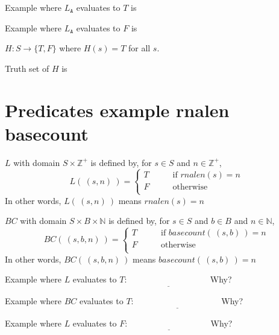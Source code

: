 \documentclass[12pt, oneside]{article}
\newcommand{\A}[0]{\texttt{A}}
\newcommand{\C}[0]{\texttt{C}}
\newcommand{\G}[0]{\texttt{G}}
\newcommand{\U}[0]{\texttt{U}}
\begin{document}
Example where $L_{\A}$ evaluates to $T$ is \underline{\phantom{$\A\C\G$~\hspace{1in}}}

\vfill

Example where $L_{\A}$ evaluates to $F$ is \underline{\phantom{$\U\A\C\U$\hspace{1in}}}

\vfill


$H: S \to \{T, F\}$ where $H(s) = T$ for all $s$.

Truth set of $H$ is \underline{}

\vfill
 \vfill
\section*{Predicates example rnalen basecount}




$L$ with domain $S \times \mathbb{Z}^+$ is defined by, for $s \in S$ and $n \in \mathbb{Z}^+$,
\[
L( ~(s, n)~) = \begin{cases}
T &\qquad\text{if $rnalen(s) = n$}\\
F &\qquad\text{otherwise}\\
\end{cases}
\]
In other words, $L(~(s,n)~)$ means $rnalen(s) = n$


\vfill

$BC$ with domain $S \times B \times \mathbb{N}$ is defined by, 
for $s \in S$ and $b \in B$ and $n \in \mathbb{N}$,
\[
BC(~(s, b, n)~) = \begin{cases}
T &\qquad\text{if $basecount(~(s,b)~) = n$}\\
F &\qquad\text{otherwise}\\
\end{cases}
\]
In other words, $BC(~(s,b,n)~)$ means $basecount(~(s,b)~) = n$


\vfill


Example where $L$ evaluates to $T$: $\underline{\phantom{(\A, 1)\hspace{1in}}}$  Why?

\vfill


Example where $BC$ evaluates to $T$: $\underline{\phantom{(\A, \A1)\hspace{1in}}}$  Why?

\vfill


Example where $L$ evaluates to $F$: $\underline{\phantom{(\A, 2)\hspace{1in}}}$ Why?
\end{document}
